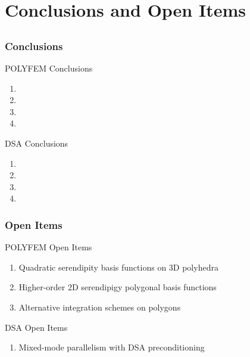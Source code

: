\documentclass[compress,10pt]{beamer}
\begin{document}
\section{Conclusions and Open Items}
\subsection{}
\begin{frame}[t]\frametitle{Conclusions}
\begin{block}{POLYFEM Conclusions}
\begin{enumerate}
\item
\item
\item
\item
\end{enumerate}
\end{block}
\begin{block}{DSA Conclusions}
\begin{enumerate}
\item
\item
\item
\item
\end{enumerate}
\end{block}
\end{frame}
\begin{frame}[t]\frametitle{Open Items}
\begin{block}{POLYFEM Open Items}
\begin{enumerate}
\item Quadratic serendipity basis functions on 3D polyhedra
\item Higher-order 2D serendipigy polygonal basis functions
\item Alternative integration schemes on polygons
\end{enumerate}
\end{block}
\begin{block}{DSA Open Items}
\begin{enumerate}
\item Mixed-mode parallelism with DSA preconditioning
\end{enumerate}
\end{block}
\end{frame}

\typeout{***********************************************************************************}
\end{document}
